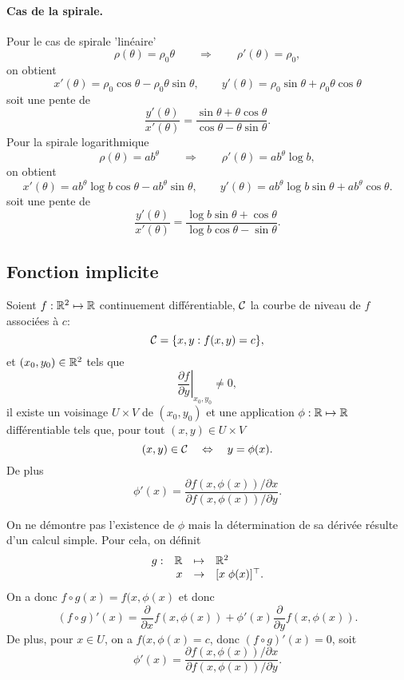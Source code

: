 \paragraph*{Cas de la spirale.}
Pour le cas de spirale 'linéaire'
$$
\rho(\theta) = \rho_0 \theta
\qquad \Rightarrow \qquad
\rho'(\theta) = \rho_0,
$$
on obtient
$$
x'(\theta) = \rho_0 \cos \theta - \rho_0 \theta \sin \theta, \qquad 
y'(\theta) = \rho_0 \sin \theta + \rho_0 \theta \cos \theta
$$
soit une pente de 
$$
\frac{y'(\theta)}{x'(\theta)} = \frac{\sin \theta + \theta \cos \theta}{\cos \theta - \theta \sin \theta}.
$$
Pour la spirale logarithmique
$$
\rho(\theta) = a b^\theta
\qquad \Rightarrow \qquad
\rho'(\theta) = a b^\theta \log b,
$$
on obtient
$$
x'(\theta) = a b^\theta \log b \cos \theta - a b^\theta \sin \theta, \qquad 
y'(\theta) = a b^\theta \log b \sin \theta + a b^\theta \cos \theta.
$$
soit une pente de 
$$
\frac{y'(\theta)}{x'(\theta)} = \frac{\log b \sin \theta + \cos \theta}{\log b \cos \theta - \sin \theta}.
$$


\subsection{Fonction implicite}

\begin{theorem*}
  Soient $f : \mathbb{R}^2 \mapsto \mathbb{R}$ continuement différentiable, $\mathcal{C}$ la courbe de niveau de $f$ associées à $c$:
  $$
  \mathcal{C} = \{x, y: f(x, y) = c\},
  $$
  et $(x_0, y_0) \in \mathbb{R}^2$ tels que 
  $$
  \left.\frac{\partial f}{\partial y}\right|_{x_0, y_0} \neq 0,
  $$
  il existe un voisinage $U \times V$ de $(x_0, y_0)$ et une application $\phi : \mathbb{R} \mapsto \mathbb{R}$ différentiable tels que, pour tout $(x, y) \in U \times V$
  $$
  (x, y) \in \mathcal{C} \quad \Leftrightarrow \quad y = \phi(x).
  $$
  De plus
  $$
  \phi'(x) = \frac{\partial f(x, \phi(x)) / \partial x}{\partial f(x, \phi(x)) / \partial y}.
  $$
\end{theorem*}

\proof 
On ne démontre pas l'existence de $\phi$ mais la détermination de sa dérivée résulte d'un calcul simple. Pour cela, on définit
$$
\begin{array}{rrcl}
  g : & \mathbb{R} & \mapsto & \mathbb{R}^2 \\
  & x & \rightarrow & [x \; \phi(x)]^\top.
\end{array}
$$
On a donc $f \circ g (x) = f(x, \phi(x)$ et donc
$$
(f \circ g)'(x) = \frac{\partial}{\partial x} f(x, \phi(x)) + \phi'(x) \frac{\partial}{\partial y} f(x, \phi(x)).
$$
De plus, pour $x \in U$, on a $f(x, \phi(x) = c$, donc $(f \circ g)'(x) = 0$, soit
$$
\phi'(x) = \frac{\partial f(x, \phi(x)) / \partial x}{\partial f(x, \phi(x)) / \partial y}.
$$

\eproof

